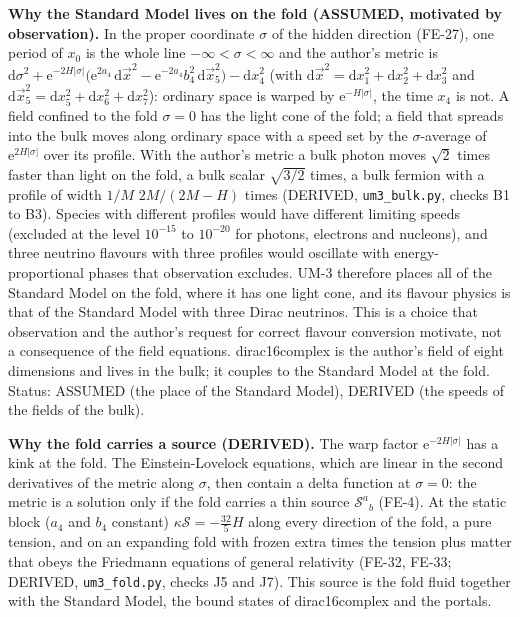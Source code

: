 \documentclass[
  10pt,
]{article}
\begin{document}
\textbf{Why the Standard Model lives on the fold (ASSUMED, motivated by
observation).} In the proper coordinate \(\sigma\) of the hidden
direction (FE-27), one period of \(x_0\) is the whole line
\(-\infty < \sigma < \infty\) and the author's metric is
\(\mathrm{d}\sigma^2 + \mathrm{e}^{-2H\lvert\sigma\rvert}\big(\mathrm{e}^{2a_4}\,\mathrm{d}\vec x^2 - \mathrm{e}^{-2a_4}b_4^2\,\mathrm{d}\vec x_5^2\big) - \mathrm{d}x_4^2\)
(with
\(\mathrm{d}\vec x^2 = \mathrm{d}x_1^2 + \mathrm{d}x_2^2 + \mathrm{d}x_3^2\)
and
\(\mathrm{d}\vec x_5^2 = \mathrm{d}x_5^2 + \mathrm{d}x_6^2 + \mathrm{d}x_7^2\)):
ordinary space is warped by \(\mathrm{e}^{-H\lvert\sigma\rvert}\), the
time \(x_4\) is not. A field confined to the fold \(\sigma = 0\) has the
light cone of the fold; a field that spreads into the bulk moves along
ordinary space with a speed set by the \(\sigma\)-average of
\(\mathrm{e}^{2H\lvert\sigma\rvert}\) over its profile. With the
author's metric a bulk photon moves \(\sqrt2\) times faster than light
on the fold, a bulk scalar \(\sqrt{3/2}\) times, a bulk fermion with a
profile of width \(1/M\) \(2M/(2M - H)\) times (DERIVED,
\texttt{um3\_bulk.py}, checks B1 to B3). Species with different profiles
would have different limiting speeds (excluded at the level \(10^{-15}\)
to \(10^{-20}\) for photons, electrons and nucleons), and three neutrino
flavours with three profiles would oscillate with energy-proportional
phases that observation excludes. UM-3 therefore places all of the
Standard Model on the fold, where it has one light cone, and its flavour
physics is that of the Standard Model with three Dirac neutrinos. This
is a choice that observation and the author's request for correct
flavour conversion motivate, not a consequence of the field equations.
dirac16complex is the author's field of eight dimensions and lives in
the bulk; it couples to the Standard Model at the fold. Status: ASSUMED
(the place of the Standard Model), DERIVED (the speeds of the fields of
the bulk).

\textbf{Why the fold carries a source (DERIVED).} The warp factor
\(\mathrm{e}^{-2H\lvert\sigma\rvert}\) has a kink at the fold. The
Einstein-Lovelock equations, which are linear in the second derivatives
of the metric along \(\sigma\), then contain a delta function at
\(\sigma = 0\): the metric is a solution only if the fold carries a thin
source \(\mathcal{S}^a{}_b\) (FE-4). At the static block (\(a_4\) and
\(b_4\) constant) \(\kappa\mathcal{S} = -\frac{32}{5}H\) along every
direction of the fold, a pure tension, and on an expanding fold with
frozen extra times the tension plus matter that obeys the Friedmann
equations of general relativity (FE-32, FE-33; DERIVED,
\texttt{um3\_fold.py}, checks J5 and J7). This source is the fold fluid
together with the Standard Model, the bound states of dirac16complex and
the portals.
\end{document}
